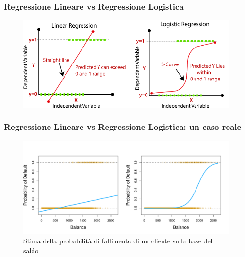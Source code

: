 \begin{frame}
	
	\frametitle{Regressione Lineare vs Regressione Logistica}
	\begin{figure}[!htbp]
		\centering
		\includegraphics[width=1.0\linewidth]{images/supervised/z_algoritms_logistic_regression/linear-regression-vs-logistic-regression.png}
	\end{figure}
	
\end{frame}


\begin{frame}
	
	\frametitle{Regressione Lineare vs Regressione Logistica: un caso reale}
	\begin{figure}[!htbp]
		\centering
		\includegraphics[width=1.0\linewidth]{images/supervised/z_algoritms_logistic_regression/linear_vs_logistic}
		\caption{Stima della probabilità di fallimento di un cliente sulla base del saldo}
	\end{figure}
	
\end{frame}


